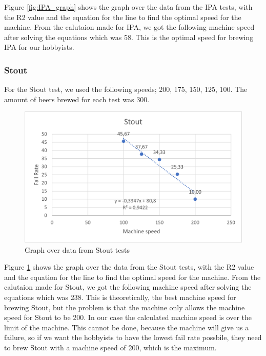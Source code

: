 Figure \ref{fig:IPA_graph} shows the graph over the data from the IPA tests, with the R2 value and the equation for the line to find the optimal speed for the machine. \newline
From the calutaion made for IPA, we got the following machine speed after solving the equations which was 58. This is the optimal speed for brewing IPA for our hobbyists. \newline

\subsubsection{Stout}
For the Stout test, we used the following speeds; 200, 175, 150, 125, 100. The amount of beers brewed for each test was 300.

\begin{center}
    \centering
    \begin{figure}[H]
        \includegraphics[width=1\textwidth]{img/Stout_graph.png}
        \caption{Graph over data from Stout tests}
        \label{fig:Stout_graph}
    \end{figure}
\end{center}

Figure \ref{fig:Stout_graph} shows the graph over the data from the Stout tests, with the R2 value and the equation for the line to find the optimal speed for the machine. \newline
From the calutaion made for Stout, we got the following machine speed after solving the equations which was 238. This is theoretically, the best machine speed for brewing Stout, but the problem is that the machine only allows the machine speed for Stout to be 200.
In our case the calculated machine speed is over the limit of the machine. This cannot be done, because the machine will give us a failure, so if we want the hobbyists to have the lowest fail rate possbile, they need to brew Stout with a machine speed of 200, which is the maximum. \newline

